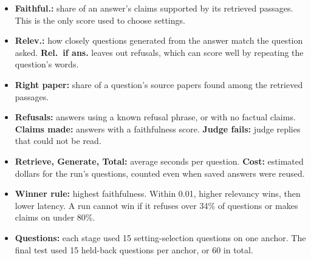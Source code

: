 \documentclass[10pt,a4paper,landscape]{article}
\begin{document}
\begin{itemize}\setlength{\itemsep}{1pt}
\item \textbf{Faithful.:} share of an answer's claims supported by its retrieved passages. This is the only score used to choose settings.
\item \textbf{Relev.:} how closely questions generated from the answer match the question asked. \textbf{Rel.\ if ans.} leaves out refusals, which can score well by repeating the question's words.
\item \textbf{Right paper:} share of a question's source papers found among the retrieved passages.
\item \textbf{Refusals:} answers using a known refusal phrase, or with no factual claims. \textbf{Claims made:} answers with a faithfulness score. \textbf{Judge fails:} judge replies that could not be read.
\item \textbf{Retrieve, Generate, Total:} average seconds per question. \textbf{Cost:} estimated dollars for the run's questions, counted even when saved answers were reused.
\item \textbf{Winner rule:} highest faithfulness. Within 0.01, higher relevancy wins, then lower latency. A run cannot win if it refuses over 34\% of questions or makes claims on under 80\%.
\item \textbf{Questions:} each stage used 15 setting-selection questions on one anchor. The final test used 15 held-back questions per anchor, or 60 in total.
\end{itemize}
\end{document}
